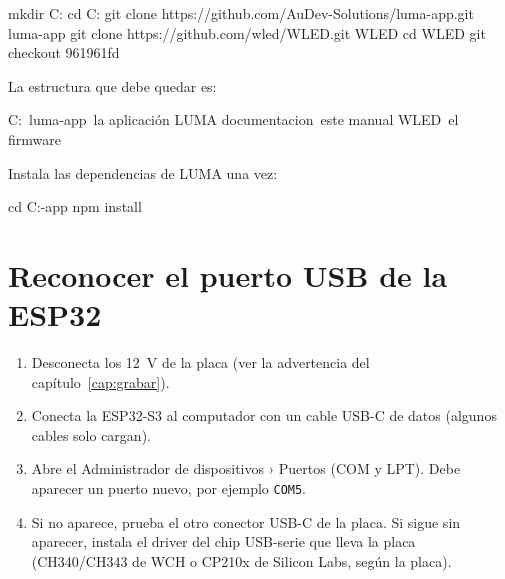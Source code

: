 
\begin{comando}
mkdir C:\Proyectos\LUMA
cd C:\Proyectos\LUMA
git clone https://github.com/AuDev-Solutions/luma-app.git luma-app
git clone https://github.com/wled/WLED.git WLED
cd WLED
git checkout 961961fd
\end{comando}


La estructura que debe quedar es:
\begin{comando}
C:\Proyectos\LUMA\
    luma-app\                  la aplicación LUMA
        documentacion\         este manual
    WLED\                      el firmware
\end{comando}

Instala las dependencias de LUMA una vez:
\begin{comando}
cd C:\Proyectos\LUMA\luma-app
npm install
\end{comando}

\section{Reconocer el puerto USB de la ESP32}

\begin{enumerate}
\item Desconecta los 12~V de la placa (ver la advertencia del capítulo~\ref{cap:grabar}).
\item Conecta la ESP32-S3 al computador con un cable USB-C de datos (algunos cables solo cargan).
\item Abre el Administrador de dispositivos › Puertos (COM y LPT). Debe aparecer un puerto nuevo, por ejemplo \texttt{COM5}.
\item Si no aparece, prueba el otro conector USB-C de la placa. Si sigue sin aparecer, instala el driver del chip USB-serie que lleva la placa (CH340/CH343 de WCH o CP210x de Silicon Labs, según la placa).
\end{enumerate}

